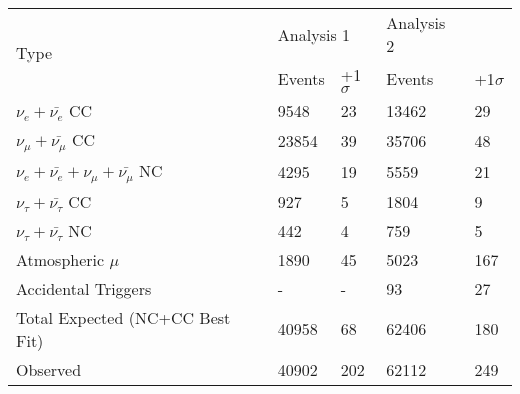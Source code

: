 \documentclass[11pt, a4paper]{article}
\begin{document}
\begin{table}[]
\centering
\begin{tabular}{@{}lllll@{}}
\toprule
\multirow{2}{*}{Type}                        & \multicolumn{2}{l}{Analysis 1} & Analysis 2 &            \\
                                             & Events       & +1$\sigma$      & Events     & +1$\sigma$ \\ \midrule
$\nu_e+\bar{\nu_e}$ CC                       & 9548         & 23              & 13462      & 29         \\
$\nu_\mu+\bar{\nu_\mu}$ CC                   & 23854        & 39              & 35706      & 48         \\
$\nu_e+\bar{\nu_e}+\nu_\mu+\bar{\nu_\mu}$ NC & 4295         & 19              & 5559       & 21         \\
$\nu_\tau+\bar{\nu_\tau}$ CC                 & 927          & 5               & 1804       & 9          \\
$\nu_\tau+\bar{\nu_\tau}$ NC                 & 442          & 4               & 759        & 5          \\
Atmospheric $\mu$                            & 1890         & 45              & 5023       & 167        \\
Accidental Triggers                          & -            & -               & 93         & 27         \\ \midrule
Total Expected (NC+CC Best Fit)              & 40958        & 68              & 62406      & 180        \\
Observed                                     & 40902        & 202             & 62112      & 249        \\ \bottomrule
\end{tabular}
\end{table}
\end{document}
